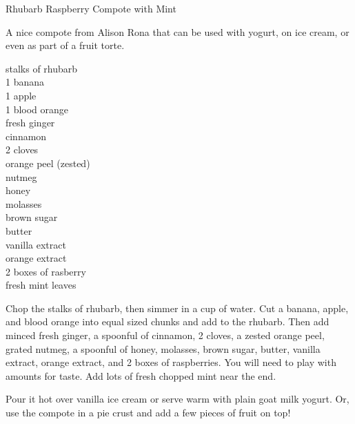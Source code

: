 \begin{entry}{Rhubarb Raspberry Compote with Mint}

\begin{open}
  A nice compote from Alison Rona that can be used with yogurt, on ice cream,
  or even as part of a fruit torte.
\end{open}
\begin{ingredients}
    stalks of rhubarb\\
    1 banana\\
    1 apple\\
    1 blood orange\\
    fresh ginger\\
    cinnamon\\
    2 cloves\\
    orange peel (zested)\\
    nutmeg\\
    honey\\
    molasses\\
    brown sugar\\
    butter\\
    vanilla extract\\
    orange extract\\
    2 boxes of rasberry\\
    fresh mint leaves
\end{ingredients}
Chop the stalks of rhubarb, then simmer in a cup of water.  Cut a banana,
apple, and blood orange into equal sized chunks and add to the rhubarb.  Then
add minced fresh ginger, a spoonful of cinnamon, 2 cloves, a zested orange peel,
grated nutmeg, a spoonful of honey, molasses, brown sugar, butter, vanilla
extract, orange extract, and 2 boxes of raspberries.  You will need to play with
amounts for taste.  Add lots of fresh chopped mint near the end.

Pour it hot over vanilla ice cream or serve warm with plain goat milk yogurt.
Or, use the compote in a pie crust and add a few pieces of fruit on top!
\end{entry}


